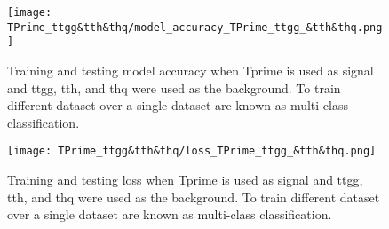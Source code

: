 \begin{figure}[H]
    \centering
    \texttt{[image: TPrime\_ttgg\&tth\&thq/model\_accuracy\_TPrime\_ttgg\_\&tth\&thq.png]}
    \caption{Training and testing model accuracy when Tprime is used as signal and ttgg, tth, and thq were used as the background. To train different dataset over a single dataset are known as multi-class classification. }
    \label{fig:my_label_23}
\end{figure}

\begin{figure}[H]
    \centering
    \texttt{[image: TPrime\_ttgg\&tth\&thq/loss\_TPrime\_ttgg\_\&tth\&thq.png]}
    \caption{Training and testing loss when Tprime is used as signal and ttgg, tth, and thq were used as the background. To train different dataset over a single dataset are known as multi-class classification. }
    \label{fig:my_label_009}
\end{figure}



 

 
 
 


